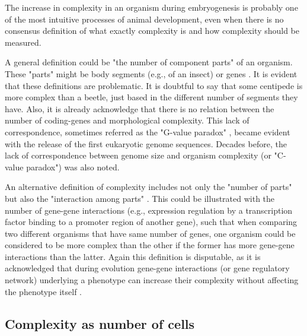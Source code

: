 
The increase in complexity in an organism during embryogenesis is probably one of the most intuitive processes of animal development, 
even when there is no consensus definition of what exactly complexity is and how complexity should be measured.


A general definition could be "the number of component parts" of an organism.
These "parts" might be body segments (e.g., of an insect) or genes
	\citep{Arthur2010}.
It is evident that these definitions are problematic.
It is doubtful to say that some centipede is more complex than a beetle, just based in the different number of segments they have.
Also, it is already acknowledge that there is no relation between the number of coding-genes and morphological complexity.
This lack of correspondence, sometimes referred as the "G-value paradox"
	\citep{Hahn2002},
became evident with the release of the first eukaryotic genome sequences.
Decades before, the lack of correspondence between genome size and organism complexity (or "C-value paradox") was also noted.


An alternative definition of complexity includes not only the "number of parts" but also the "interaction among parts" 
	\citep{Arthur2010}.
This could be illustrated with the number of gene-gene interactions (e.g., expression regulation by a transcription factor binding to a promoter region of another gene),
such that when comparing two different organisms that have same number of genes, 
one organism could be considered to be more complex than the other if the former has more gene-gene interactions than the latter.
Again this definition is disputable, as it is acknowledged that during evolution gene-gene interactions (or gene regulatory network) underlying a phenotype
can increase their complexity without affecting the phenotype itself
	\citep{Muller1999,True2001,Salazar-Ciudad2009}.

\subsection{Complexity as number of cells}

